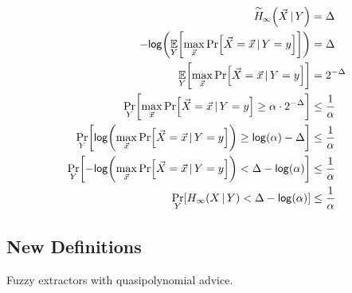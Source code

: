 \begin{align}
    \acminent{\vec{X}}{Y} &= \Delta\\
    -\log{\Exlim{Y}{\max\limits_{\vec{x}} \Prob{\Vec{X} = \vec{x} \,|\, Y = y}}} &= \Delta\\
    \Exlim{Y}{\max\limits_{\vec{x}} \Prob{\Vec{X} = \vec{x} \,|\, Y = y}} &= 2^{-\Delta}\\
    \Problim{Y}{\max\limits_{\vec{x}} \Prob{\Vec{X} = \vec{x} \,|\, Y = y} \geq \alpha \cdot 2^{-\Delta}} &\leq \frac{1}{\alpha} \\
    \Problim{Y}{\log{\max\limits_{\vec{x}} \Prob{\Vec{X} = \vec{x} \,|\, Y = y}} \geq \log{\alpha} -\Delta} &\leq \frac{1}{\alpha} \\
    \Problim{Y}{-\log{\max\limits_{\vec{x}} \Prob{\Vec{X} = \vec{x} \,|\, Y = y}} < \Delta -\log{\alpha}} &\leq \frac{1}{\alpha} \\
    \Problim{Y}{\minent{X\, |\, Y} < \Delta -\log{\alpha}} &\leq \frac{1}{\alpha}
\end{align}

\subsection{New Definitions}
Fuzzy extractors with quasipolynomial advice. 